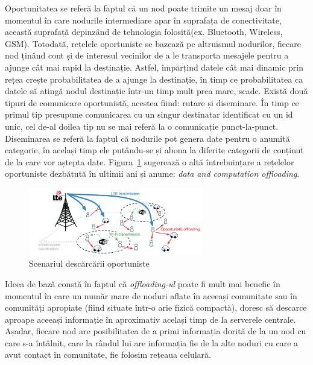 \documentclass[12pt,a4paper]{report}
\begin{document}
Oportunitatea se referă la faptul că un nod poate trimite un mesaj doar în momentul în care nodurile intermediare apar în suprafața de conectivitate, această suprafață depinzând de tehnologia folosită(ex. Bluetooth, Wireless, GSM). Totodată, rețelele oportuniste se bazează pe altruismul nodurilor, fiecare nod ținând cont și de interesul vecinilor de a le transporta mesajele pentru a ajunge cât mai rapid la destinație. Astfel, împărțind datele cât mai dinamic prin rețea crește probabilitatea de a ajunge la destinație, în timp ce probabilitatea ca datele să atingă nodul destinație într-un timp mult prea mare, scade. Există două tipuri de comunicare oportunistă, acestea fiind: rutare și diseminare. În timp ce primul tip presupune comunicarea cu un singur destinatar identificat cu un id unic, cel de-al doilea tip nu se mai referă la o comunicație punct-la-punct. Diseminarea se referă la faptul că nodurile pot genera date pentru o anumită categorie, în același timp ele putându-se și abona la diferite categorii de conținut de la care vor aștepta date. 
Figura~\ref{fig:pic1} sugerează o altă întrebuințare a rețelelor oportuniste dezbătută în ultimii ani și anume: \textit{data and computation offloading}.
\begin{figure}[th]
\centering
\includegraphics[width=3in]{pics/ONs.png}
  \caption{Scenariul descărcării oportuniste}
  \label{fig:pic1}
\end{figure}
Ideea de bază constă în faptul că \textit{offloading-ul} poate fi mult mai benefic în momentul în care un număr mare de noduri aflate în aceeași comunitate sau în comunități apropiate (fiind situate într-o arie fizică compactă), doresc să descarce aproape aceeași informație în aproximativ același timp de la serverele centrale. Așadar, fiecare nod are posibilitatea de a primi informația dorită de la un nod cu care s-a întâlnit, care la rândul lui are informația fie de la alte noduri cu care a avut contact în comunitate, fie folosim rețeaua celulară.
\end{document}
